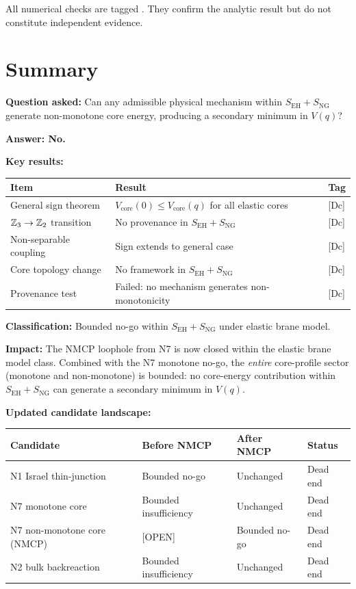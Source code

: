 All numerical checks are tagged . They confirm the
analytic result but do not constitute independent evidence.

\section{Summary}
\label{sec:NMCP:summary}

\begin{resultbox}[title=NMCP WP2 Summary]
\textbf{Question asked:} Can any admissible physical mechanism within
$S_{\mathrm{EH}} + S_{\mathrm{NG}}$ generate non-monotone core energy,
producing a secondary minimum in $V(q)$?

\textbf{Answer: No.}

\textbf{Key results:}
\begin{center}
\begin{tabular}{lll}
\toprule
\textbf{Item} & \textbf{Result} & \textbf{Tag} \\
\midrule
General sign theorem & $V_{\mathrm{core}}(0) \leq V_{\mathrm{core}}(q)$
for all elastic cores & [Dc] \\
$\mathbb{Z}_3 \to \mathbb{Z}_2$ transition & No provenance in
$S_{\mathrm{EH}} + S_{\mathrm{NG}}$ & [Dc] \\
Non-separable coupling & Sign extends to general case & [Dc] \\
Core topology change & No framework in
$S_{\mathrm{EH}} + S_{\mathrm{NG}}$ & [Dc] \\
Provenance test & Failed: no mechanism generates non-monotonicity
& [Dc] \\
\bottomrule
\end{tabular}
\end{center}

\textbf{Classification:} Bounded no-go within
$S_{\mathrm{EH}} + S_{\mathrm{NG}}$ under elastic brane model.

\textbf{Impact:} The NMCP loophole from N7 is now closed within the
elastic brane model class. Combined with the N7 monotone no-go, the
\emph{entire} core-profile sector (monotone and non-monotone) is
bounded: no core-energy contribution within $S_{\mathrm{EH}} +
S_{\mathrm{NG}}$ can generate a secondary minimum in $V(q)$.

\textbf{Updated candidate landscape:}
\begin{center}
\begin{tabular}{llll}
\toprule
\textbf{Candidate} & \textbf{Before NMCP} & \textbf{After NMCP}
& \textbf{Status} \\
\midrule
N1 Israel thin-junction & Bounded no-go & Unchanged & Dead end \\
N7 monotone core & Bounded insufficiency & Unchanged & Dead end \\
N7 non-monotone core (NMCP) & [OPEN] & Bounded no-go & Dead end \\
N2 bulk backreaction & Bounded insufficiency & Unchanged & Dead end \\
\bottomrule
\end{tabular}
\end{center}


\end{resultbox}
